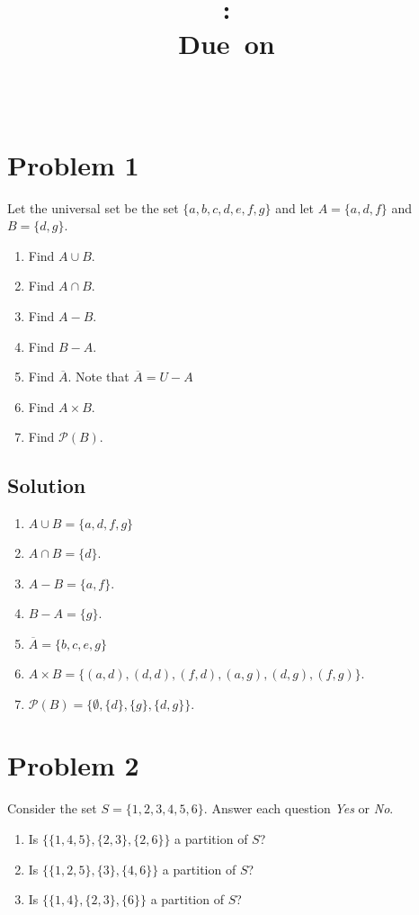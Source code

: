 \documentclass[table]{article}
\title{
    \vspace{2in}
    \textmd{\textbf{\hmwkClass:\ \hmwkTitle}}\\
    \normalsize\vspace{0.1in}\small{Due\ on\ \hmwkDueDate}\\
    \vspace{0.1in}\large{\textit{\hmwkClassInstructor\ \hmwkClassTime}}
    \vspace{3in}
}
\author{\hmwkAuthorName}
\date{}
\begin{document}
\maketitle
\pagebreak
\section{Problem 1}
Let the universal set be the set $\{a, b, c, d, e, f, g\}$ and let $A = \{a, d, f\}$ and $B = \{d, g\}$.
\begin{enumerate}[nosep, label=\alph*)]
\item Find $A \cup B$.
\item Find $A \cap B$.
\item Find $A - B$.
\item Find $B - A$.
\item Find $\overline{A}$. Note that $\overline{A} = U - A$
\item Find $A \times B$.
\item Find $\mathcal{P}(B)$.
\end{enumerate}
\subsection{Solution}
\begin{enumerate}[nosep, label=\alph*)]
\item $A \cup B = \{a, d, f, g\}$
\item $A \cap B = \{d\}$.
\item $A - B = \{a, f\}$.
\item $B - A = \{g\}$.
\item $\overline{A} = \{b, c, e, g\}$
\item $A \times B = \{(a, d), (d, d), (f, d), (a, g), (d, g), (f, g)\}$.
\item $\mathcal{P}(B) = \{\emptyset, \{d\}, \{g\}, \{d, g\}\}$.
\end{enumerate}
\section{Problem 2}
Consider the set $S = \{1, 2, 3, 4, 5, 6\}$. Answer each question \textit{Yes} or \textit{No}.
\begin{enumerate}[nosep, label=\alph*)]
\item Is $\{\{1, 4, 5\}, \{2, 3\}, \{2, 6\}\}$ a partition of $S$?
\item Is $\{\{1, 2, 5\}, \{3\}, \{4, 6\}\}$ a partition of $S$?
\item Is $\{\{1,4\}, \{2,3\}, \{6\}\}$ a partition of $S$?
\end{enumerate}
\end{document}
